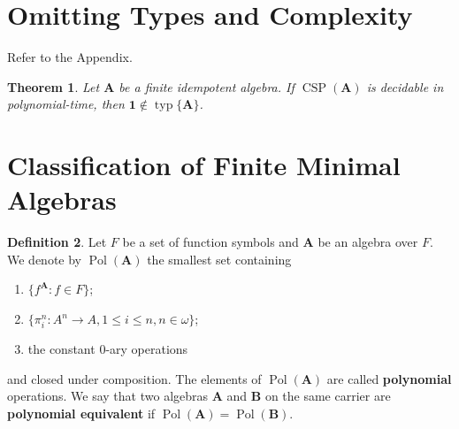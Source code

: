 \documentclass{amsart}
\theoremstyle{plain}
\newtheorem{theorem}{Theorem}[section]
\newtheorem{lemma}[theorem]{Lemma}
\theoremstyle{definition}
\newtheorem{definition}[theorem]{Definition}
\theoremstyle{remark}
\DeclareMathOperator{\Clo}{Clo}
\DeclareMathOperator{\CSP}{CSP}
\DeclareMathOperator{\Pol}{Pol}
\DeclareMathOperator{\NP}{NP}
\DeclareMathOperator{\typ}{typ}
\begin{document}
\begin{comment}
\begin{lemma}
    Let $\EuScript{A}$ be a relational structure. 
    If $\Pol(\EuScript{A})$ contains a majority operation, $\CSP(\EuScript{\EuScript{A}})$ is polynomial-time decidable. 
\end{lemma}

\begin{theorem}
    Let $\mathbf{A}$ be a finite strictly simple surjective algebra.
    If all the elements of $\Clo(\mathbf{A})$ are essentially unary, then $\CSP(\mathbf{A})$ is $\NP$-complete. 
    Otherwise, $\CSP(\mathbf{A})$ is polynomial-time decidable. 
    \begin{proof}

    \end{proof}
\end{theorem}
\end{comment}

\section{Omitting Types and Complexity}
Refer to the Appendix. 

\begin{theorem}
    Let $\mathbf{A}$ be a finite idempotent algebra. 
    If $\CSP(\mathbf{A})$ is decidable in polynomial-time, then $\mathbf{1} \notin \typ\{\mathbf{A}\}$.  
\end{theorem}

\appendix
\section{Classification of Finite Minimal Algebras}

\begin{definition}
    Let $F$ be a set of function symbols and $\mathbf{A}$ be an algebra over $F$. 
    We denote by $\Pol(\mathbf{A})$ the smallest set containing 
    \begin{enumerate}
        \item $\{f^\mathbf{A}: f \in F\}$; 
        \item $\{\pi^n_i: A^n \to A, 1 \le i \le n, n \in \omega\}$; 
        \item the constant $0$-ary operations
    \end{enumerate}
and closed under composition. 
The elements of $\Pol(\mathbf{A})$ are called \textbf{polynomial} operations. 
We say that two algebras $\mathbf{A}$ and $\mathbf{B}$ on the same carrier are \textbf{polynomial equivalent} if $\Pol(\mathbf{A})=\Pol(\mathbf{B})$. 
\end{definition}
\end{document}
